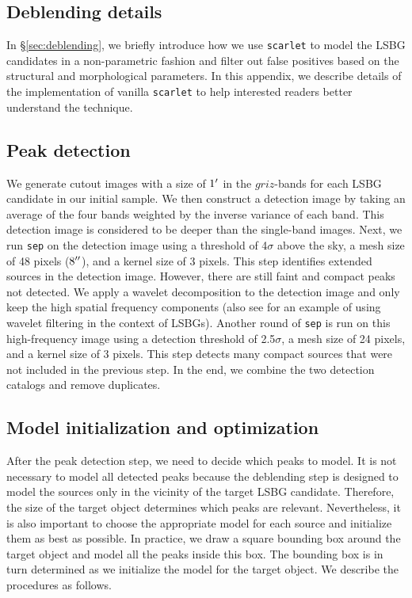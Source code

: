 \documentclass[twocolumn,astrosymb,twocolappendix]{aastex631}
\newcommand{\code}[1]{\texttt{#1}}
\begin{document}
\begin{CJK*}{UTF8}{gbsn}

\section{Deblending details}\label{ap:deblending}
In \S\ref{sec:deblending}, we briefly introduce how we use \code{scarlet} to model the LSBG candidates in a non-parametric fashion and filter out false positives based on the structural and morphological parameters. In this appendix, we describe details of the implementation of vanilla \code{scarlet} to help interested readers better understand the technique.

\subsection{Peak detection}\label{sec:peak}
We generate cutout images with a size of $1\mbox{$^\prime$}$ in the $griz$-bands for each LSBG candidate in our initial sample. We then construct a detection image by taking an average of the four bands weighted by the inverse variance of each band. This detection image is considered to be deeper than the single-band images. 
Next, we run \code{sep} on the detection image using a threshold of 4$\sigma$ above the sky, a mesh size of 48 pixels ($8\mbox{$^{\prime\prime}$}$), and a kernel size of 3 pixels. This step identifies extended sources in the detection image. However, there are still faint and compact peaks not detected. We apply a wavelet decomposition to the detection image \citep{Starck2015} and only keep the high spatial frequency components (also see \citealt{Zaritsky2019} for an example of using wavelet filtering in the context of LSBGs). Another round of \code{sep} is run on this high-frequency image using a detection threshold of 2.5$\sigma$, a mesh size of 24 pixels, and a kernel size of 3 pixels. This step detects many compact sources that were not included in the previous step. In the end, we combine the two detection catalogs and remove duplicates. 

\subsection{Model initialization and optimization}
After the peak detection step, we need to decide which peaks to model. It is not necessary to model all detected peaks because the deblending step is designed to model the sources only in the vicinity of the target LSBG candidate. Therefore, the size of the target object determines which peaks are relevant. Nevertheless, it is also important to choose the appropriate model for each source and initialize them as best as possible. In practice, we draw a square bounding box around the target object and model all the peaks inside this box. The bounding box is in turn determined as we initialize the model for the target object. We describe the procedures as follows. 


\end{CJK*}
\end{document}
